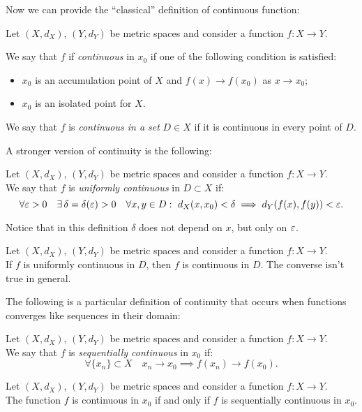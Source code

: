 Now we can provide the ``classical'' definition of continuous function:
\begin{defn} \label{continuous-functions-metric}
	Let $(X, d_X)$, $(Y, d_Y)$ be metric spaces and consider a function $f: X \to Y$.
	
	We say that $f$ if \emph{continuous} in $x_0$ if one of the following condition is satisfied:
	\begin{itemize}
		\item $x_0$ is an accumulation point of $X$ and $f(x) \to f(x_0)$ as $x \to x_0$;
		\item $x_0$ is an isolated point for $X$.
	\end{itemize}
	
	We say that $f$ is \emph{continuous in a set} $D \in X$ if it is continuous in every point of $D$.
\end{defn}

A stronger version of continuity is the following:
\begin{defn}\label{uniformly-continuous-functions}
	Let $(X, d_X)$, $(Y, d_Y)$ be metric spaces and consider a function $f: X \to Y$.\\
	We say that $f$ is \emph{uniformly continuous} in $D \subset X$ if:
	$$
		\forall \varepsilon > 0 
		\quad \exists \, \delta = \delta(\varepsilon) > 0 
		\quad \forall x, y \in D : 
		\ d_X(x, x_0) < \delta 
		\implies d_Y(f(x), f(y)) 
		< \varepsilon
	.
	$$
\end{defn}
Notice that in this definition $\delta$ does not depend on $x$, but only on $\varepsilon$.
\begin{prop}
	Let $(X, d_X)$, $(Y, d_Y)$ be metric spaces and consider a function $f: X \to Y$.\\
	If $f$ is uniformly continuous in $D$, then $f$ is continuous in $D$. The converse isn't true in general.
\end{prop}


The following is a particular definition of continuity that occurs when functions converges like sequences in their domain:
\begin{defn} \label{defn-seq-continuity-metric-sp}
	Let $(X, d_X)$, $(Y, d_Y)$ be metric spaces and consider a function $f: X \to Y$.\\
	We say that $f$ is \emph{sequentially continuous} in $x_0$ if:
	$$\forall \{x_n\} \subset X \quad x_n \to x_0 \implies f(x_n) \to f(x_0).$$
\end{defn}

\begin{prop}
	Let $(X, d_X)$, $(Y, d_Y)$ be metric spaces and consider a function $f: X \to Y$.\\
	The function $f$ is continuous in $x_0$ if and only if $f$ is sequentially continuous in $x_0$.
\end{prop}

